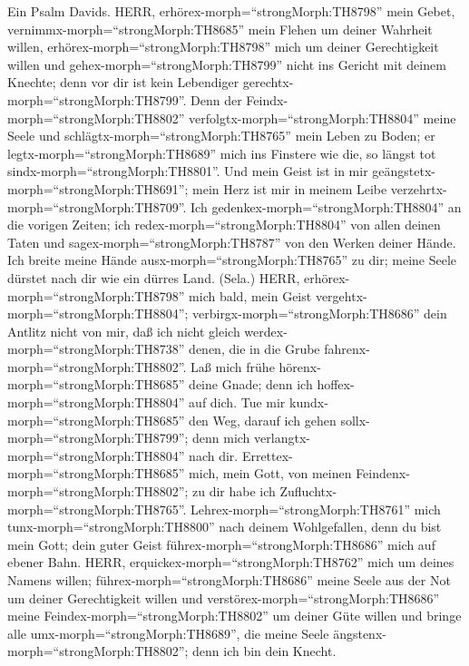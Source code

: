  Ein Psalm Davids. HERR,
erhörex-morph=``strongMorph:TH8798'' mein Gebet,
vernimmx-morph=``strongMorph:TH8685'' mein Flehen um deiner Wahrheit
willen, erhörex-morph=``strongMorph:TH8798'' mich um deiner
Gerechtigkeit willen  und gehex-morph=``strongMorph:TH8799''
nicht ins Gericht mit deinem Knechte; denn vor dir ist kein Lebendiger
gerechtx-morph=``strongMorph:TH8799''.  Denn der
Feindx-morph=``strongMorph:TH8802''
verfolgtx-morph=``strongMorph:TH8804'' meine Seele und
schlägtx-morph=``strongMorph:TH8765'' mein Leben zu Boden; er
legtx-morph=``strongMorph:TH8689'' mich ins Finstere wie die, so längst
tot sindx-morph=``strongMorph:TH8801''.  Und mein Geist ist
in mir geängstetx-morph=``strongMorph:TH8691''; mein Herz ist mir in
meinem Leibe verzehrtx-morph=``strongMorph:TH8709''.  Ich
gedenkex-morph=``strongMorph:TH8804'' an die vorigen Zeiten; ich
redex-morph=``strongMorph:TH8804'' von allen deinen Taten und
sagex-morph=``strongMorph:TH8787'' von den Werken deiner Hände.
 Ich breite meine Hände ausx-morph=``strongMorph:TH8765'' zu
dir; meine Seele dürstet nach dir wie ein dürres Land. (Sela.)
 HERR, erhörex-morph=``strongMorph:TH8798'' mich bald, mein
Geist vergehtx-morph=``strongMorph:TH8804'';
verbirgx-morph=``strongMorph:TH8686'' dein Antlitz nicht von mir, daß
ich nicht gleich werdex-morph=``strongMorph:TH8738'' denen, die in die
Grube fahrenx-morph=``strongMorph:TH8802''.  Laß mich frühe
hörenx-morph=``strongMorph:TH8685'' deine Gnade; denn ich
hoffex-morph=``strongMorph:TH8804'' auf dich. Tue mir
kundx-morph=``strongMorph:TH8685'' den Weg, darauf ich gehen
sollx-morph=``strongMorph:TH8799''; denn mich
verlangtx-morph=``strongMorph:TH8804'' nach dir. 
Errettex-morph=``strongMorph:TH8685'' mich, mein Gott, von meinen
Feindenx-morph=``strongMorph:TH8802''; zu dir habe ich
Zufluchtx-morph=``strongMorph:TH8765''. 
Lehrex-morph=``strongMorph:TH8761'' mich
tunx-morph=``strongMorph:TH8800'' nach deinem Wohlgefallen, denn du bist
mein Gott; dein guter Geist führex-morph=``strongMorph:TH8686'' mich auf
ebener Bahn.  HERR, erquickex-morph=``strongMorph:TH8762''
mich um deines Namens willen; führex-morph=``strongMorph:TH8686'' meine
Seele aus der Not um deiner Gerechtigkeit willen  und
verstörex-morph=``strongMorph:TH8686'' meine
Feindex-morph=``strongMorph:TH8802'' um deiner Güte willen und bringe
alle umx-morph=``strongMorph:TH8689'', die meine Seele
ängstenx-morph=``strongMorph:TH8802''; denn ich bin dein Knecht.

